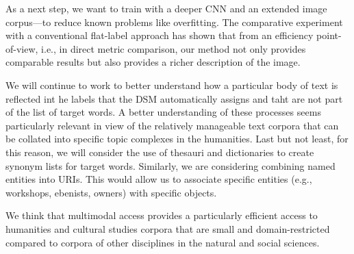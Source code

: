As a next step, we want to train with a deeper CNN and an extended image corpus---to reduce known problems like overfitting. The comparative experiment with a conventional flat-label approach has shown that from an efficiency point-of-view, i.e., in direct metric comparison, our method not only provides comparable results but also provides a richer description of the image.


We will continue to work to better understand how a particular body of text is reflected int he labels that the DSM automatically assigns and taht are not part of the list of target words. A better understanding of these processes seems particularly relevant in view of the relatively manageable text corpora that can be collated into specific topic complexes in the humanities. Last but not least, for this reason, we will consider the use of thesauri and dictionaries to create synonym lists for target words. Similarly, we are considering combining named entities into URIs. This would allow us to associate specific entities (e.g., workshops, ebenists, owners) with specific objects.

We think that multimodal access provides a particularly efficient access to humanities and cultural studies corpora that are small and domain-restricted compared to corpora of other disciplines in the natural and social sciences.